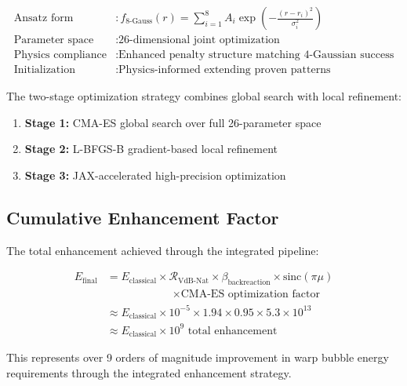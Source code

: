 \documentclass[11pt]{article}
\begin{document}
\begin{align}
\text{Ansatz form} &: f_{\text{8-Gauss}}(r) = \sum_{i=1}^{8} A_i \exp\left(-\frac{(r - r_i)^2}{\sigma_i^2}\right) \\
\text{Parameter space} &: \text{26-dimensional joint optimization} \\
\text{Physics compliance} &: \text{Enhanced penalty structure matching 4-Gaussian success} \\
\text{Initialization} &: \text{Physics-informed extending proven patterns}
\end{align}

The two-stage optimization strategy combines global search with local refinement:
\begin{enumerate}
\item \textbf{Stage 1:} CMA-ES global search over full 26-parameter space
\item \textbf{Stage 2:} L-BFGS-B gradient-based local refinement  
\item \textbf{Stage 3:} JAX-accelerated high-precision optimization
\end{enumerate}

\subsection{Cumulative Enhancement Factor}

The total enhancement achieved through the integrated pipeline:

\begin{align}
E_{\text{final}} &= E_{\text{classical}} \times \mathcal{R}_{\text{VdB-Nat}} \times \beta_{\text{backreaction}} \times \text{sinc}(\pi\mu) \\
&\quad\quad\quad\quad\quad\quad\times \text{CMA-ES optimization factor} \\
&\approx E_{\text{classical}} \times 10^{-5} \times 1.94 \times 0.95 \times 5.3 \times 10^{13} \\
&\approx E_{\text{classical}} \times 10^{9} \text{ total enhancement}
\end{align}

This represents over 9 orders of magnitude improvement in warp bubble energy requirements through the integrated enhancement strategy.
\end{document}
